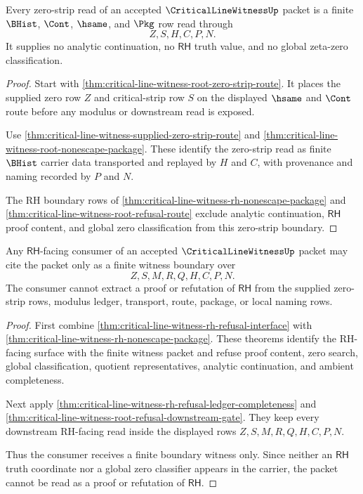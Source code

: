 \begin{theorem}
\label{thm:critical-line-witness-zero-strip-boundary}
Every zero-strip read of an accepted $\CriticalLineWitnessUp$ packet is a finite $\BHist$, $\Cont$, $\hsame$, and $\Pkg$ row read through
$$
Z,S,H,C,P,N.
$$
It supplies no analytic continuation, no $\mathsf{RH}$ truth value, and no global zeta-zero classification.
\end{theorem}
\begin{proof}
Start with \autoref{thm:critical-line-witness-root-zero-strip-route}. It places the supplied zero row $Z$ and critical-strip row $S$ on the displayed $\hsame$ and $\Cont$ route before any modulus or downstream read is exposed.

Use \autoref{thm:critical-line-witness-supplied-zero-strip-route} and \autoref{thm:critical-line-witness-root-nonescape-package}. These identify the zero-strip read as finite $\BHist$ carrier data transported and replayed by $H$ and $C$, with provenance and naming recorded by $P$ and $N$.

The RH boundary rows of \autoref{thm:critical-line-witness-rh-nonescape-package} and \autoref{thm:critical-line-witness-root-refusal-route} exclude analytic continuation, $\mathsf{RH}$ proof content, and global zero classification from this zero-strip boundary.
\end{proof}

\begin{theorem}
\label{thm:critical-line-witness-rh-boundary-refusal}
Any $\mathsf{RH}$-facing consumer of an accepted $\CriticalLineWitnessUp$ packet may cite the packet only as a finite witness boundary over
$$
Z,S,M,R,Q,H,C,P,N.
$$
The consumer cannot extract a proof or refutation of $\mathsf{RH}$ from the supplied zero-strip rows, modulus ledger, transport, route, package, or local naming rows.
\end{theorem}
\begin{proof}
First combine \autoref{thm:critical-line-witness-rh-refusal-interface} with \autoref{thm:critical-line-witness-rh-nonescape-package}. These theorems identify the RH-facing surface with the finite witness packet and refuse proof content, zero search, global classification, quotient representatives, analytic continuation, and ambient completeness.

Next apply \autoref{thm:critical-line-witness-rh-refusal-ledger-completeness} and \autoref{thm:critical-line-witness-root-refusal-downstream-gate}. They keep every downstream RH-facing read inside the displayed rows $Z,S,M,R,Q,H,C,P,N$.

Thus the consumer receives a finite boundary witness only. Since neither an $\mathsf{RH}$ truth coordinate nor a global zero classifier appears in the carrier, the packet cannot be read as a proof or refutation of $\mathsf{RH}$.
\end{proof}
